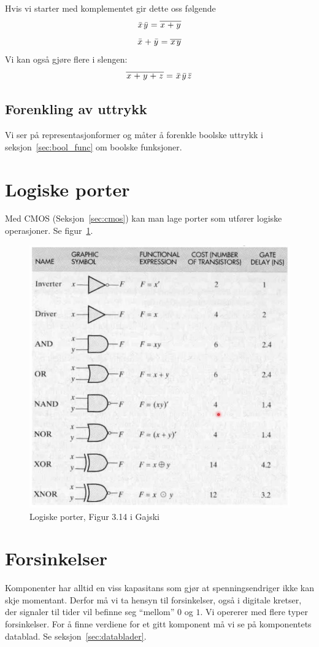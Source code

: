 \documentclass[12pt,a4paper,norsk]{article}
\begin{document}
Hvis vi starter med komplementet gir dette oss følgende
\[\kom{x}\kom{y} = \overline{\var{x}+\var{y}}\]
\[\kom{x} + \kom{y} = \overline{\var{x}\var{y}}\]
Vi kan også gjøre flere i slengen:
\[\overline{\var{x} + \var{y} + \var{z}} = \kom{x}\kom{y}\kom{z}\]


\subsection{Forenkling av uttrykk}
Vi ser på representasjonformer og måter å forenkle boolske uttrykk i
seksjon~\ref{sec:bool_func} om boolske funksjoner.

\section{Logiske porter}\label{sec:logiske_porter}
Med CMOS (Seksjon~\ref{sec:cmos}) kan man lage porter som utfører logiske
operasjoner. Se figur~\ref{fig:porter}.

\begin{figure}[H]
  \centering
  \includegraphics[width=\textwidth,height=\textheight,keepaspectratio]{Krets_Gates}
  \caption{Logiske porter, Figur 3.14 i Gajski\label{fig:porter}}
\end{figure}

\section{Forsinkelser}\label{sec:forsinkelser}
Komponenter har alltid en viss kapasitans som gjør at spenningsendriger ikke kan
skje momentant. Derfor må vi ta hensyn til forsinkelser, også i digitale
kretser, der signaler til tider vil befinne seg ``mellom'' $0$ og $1$. Vi
opererer med flere typer forsinkelser. For å finne verdiene for et gitt
komponent må vi se på komponentets datablad. Se seksjon~\ref{sec:datablader}.
\end{document}
